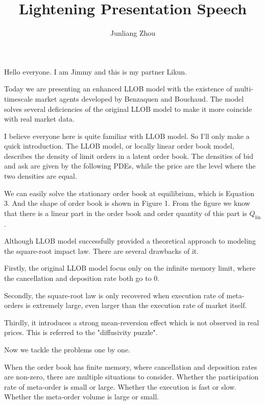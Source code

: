 \documentclass{article}
\title{Lightening Presentation Speech}
\author{Junliang Zhou}
\begin{document}
\maketitle

Hello everyone. I am Jimmy and this is my partner Likun. \newline

Today we are presenting an enhanced LLOB model with the existence of multi-timescale market agents developed by Benzaquen and Bouchaud. The model solves several deficiencies of the original LLOB model to make it more coincide with real market data. \newline

I believe everyone here is quite familiar with LLOB model. So I'll only make a quick introduction. The LLOB model, or locally linear order book model, describes the density of limit orders in a latent order book. The densities of bid and ask are given by the following PDEs, while the price are the level where the two densities are equal. \newline

We can easily solve the stationary order book at equilibrium, which is Equation 3. And the shape of order book is shown in Figure 1. From the figure we know that there is a linear part in the order book and order quantity of this part is $Q_\text{lin}$. \newline

Although LLOB model successfully provided a theoretical approach to modeling the square-root impact law. There are several drawbacks of it. \newline

Firstly, the original LLOB model focus only on the infinite memory limit, where the cancellation and deposition rate both go to 0. \newline

Secondly, the square-root law is only recovered when execution rate of meta-orders is extremely large, even larger than the execution rate of market itself. \newline

Thirdly, it introduces a strong mean-reversion effect which is not observed in real prices. This is referred to the "diffusivity puzzle". \newline

Now we tackle the problems one by one. \newline

When the order book has finite memory, where cancellation and deposition rates are non-zero, there are multiple situations to consider. Whether the participation rate of meta-order is small or large. Whether the execution is fast or slow. Whether the meta-order volume is large or small. \newline
\end{document}
